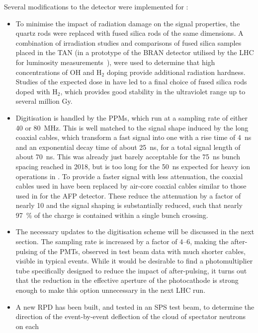 \documentclass[cernpreprint, atlasdraft=false, UKenglish,british,orcidlogo, texmf, orcidlogo]{atlasdoc}
\begin{document}
Several modifications to the detector were implemented for \RunThr:
\begin{itemize}
\item To minimise the impact of radiation damage on the signal
properties, the quartz rods were replaced with fused silica
rods of the same dimensions.  A combination of irradiation studies
and comparisons of fused silica samples placed in the \gls{TAN} (in a prototype of
the \gls{BRAN} detector utilised by the \gls{LHC} for luminosity measurements~\cite{MATIS2017114}),
were used to determine that high concentrations of OH and
H$_2$ doping provide additional radiation hardness.  Studies of the
expected dose in \RunThr have led to a final choice of fused silica rods doped with
H$_2$, which provides good stability in the ultraviolet range up to
several million \si{\gray}.
\item Digitisation is handled by the \glspl{PPM}, which run
at a sampling rate of either \num{40} or \SI{80}{\MHz}.  This is well matched to the
signal shape induced by the long coaxial cables, which transform a
fast signal into one with a rise time of \SI{4}{\ns} and an exponential decay
time of about \SI{25}{\ns}, for a total signal length of about \SI{70}{\ns}.
This was already just barely acceptable for the \SI{75}{\ns} bunch spacing
reached in 2018, but is too long for the \SI{50}{\ns} expected for heavy ion operations in
\RunThr.
To provide a faster signal with less attenuation, the coaxial
cables used in \RunTwo have been replaced by air-core coaxial cables similar to those
used in \RunTwo for the \gls{AFP} detector.  These reduce the attenuation
by a factor of nearly \num{10} and the signal shaping is substantially
reduced, such that nearly \SI{97}{\percent} of the charge is contained within a single bunch crossing.
\item The necessary updates to the digitisation scheme will be
discussed in the next section. The sampling rate is
increased by a factor of \numrange{4}{6}, making the after-pulsing of
the \glspl{PMT}, observed in test beam data with much shorter cables,
visible in typical events.  While it would be desirable to find a
photomultiplier tube specifically designed to reduce the impact of
after-pulsing, it turns out that the reduction in the effective
aperture of the photocathode is strong enough to make this
option unnecessary in the next \gls{LHC} run.
\item A new \gls{RPD} has been built, and
tested in an \gls{SPS} test beam, to determine the direction of the
event-by-event deflection of the cloud of spectator neutrons on each

\end{itemize}
\end{document}
